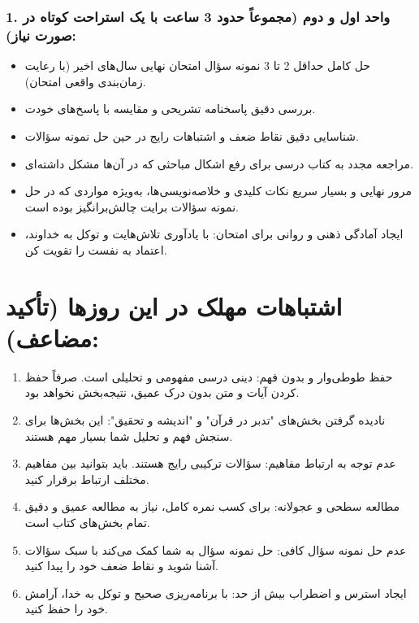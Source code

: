 \documentclass{article}
\begin{document}
\subsubsection*{1. واحد اول و دوم (مجموعاً حدود 3 ساعت با یک استراحت کوتاه در صورت نیاز):}
\begin{itemize}
    \item حل کامل حداقل 2 تا 3 نمونه سؤال امتحان نهایی سال‌های اخیر (با رعایت زمان‌بندی واقعی امتحان).
    \item بررسی دقیق پاسخنامه تشریحی و مقایسه با پاسخ‌های خودت.
    \item شناسایی دقیق نقاط ضعف و اشتباهات رایج در حین حل نمونه سؤالات.
    \item مراجعه مجدد به کتاب درسی برای رفع اشکال مباحثی که در آن‌ها مشکل داشته‌ای.
    \item مرور نهایی و بسیار سریع نکات کلیدی و خلاصه‌نویسی‌ها، به‌ویژه مواردی که در حل نمونه سؤالات برایت چالش‌برانگیز بوده است.
    \item ایجاد آمادگی ذهنی و روانی برای امتحان: با یادآوری تلاش‌هایت و توکل به خداوند، اعتماد به نفست را تقویت کن.
\end{itemize}

\bigskip
\hrulefill
\bigskip

\section*{اشتباهات مهلک در این روزها (تأکید مضاعف):}

\begin{enumerate}
    \item حفظ طوطی‌وار و بدون فهم: دینی درسی مفهومی و تحلیلی است. صرفاً حفظ کردن آیات و متن بدون درک عمیق، نتیجه‌بخش نخواهد بود.
    \item نادیده گرفتن بخش‌های "تدبر در قرآن" و "اندیشه و تحقیق": این بخش‌ها برای سنجش فهم و تحلیل شما بسیار مهم هستند.
    \item عدم توجه به ارتباط مفاهیم: سؤالات ترکیبی رایج هستند. باید بتوانید بین مفاهیم مختلف ارتباط برقرار کنید.
    \item مطالعه سطحی و عجولانه: برای کسب نمره کامل، نیاز به مطالعه عمیق و دقیق تمام بخش‌های کتاب است.
    \item عدم حل نمونه سؤال کافی: حل نمونه سؤال به شما کمک می‌کند با سبک سؤالات آشنا شوید و نقاط ضعف خود را پیدا کنید.
    \item ایجاد استرس و اضطراب بیش از حد: با برنامه‌ریزی صحیح و توکل به خدا، آرامش خود را حفظ کنید.
\end{enumerate}
\end{document}
